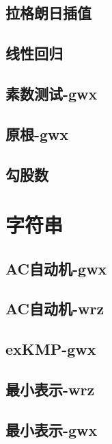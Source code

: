 \documentclass[titlepage,a4paper,10pt]{article}
\begin{document}
\begin{spacing}{0.8}
			\subsection{拉格朗日插值}
				
			\subsection{线性回归}
				
			\subsection{素数测试-gwx}
				
			\subsection{原根-gwx}
				
			\subsection{勾股数}
				
		\section{字符串}
			\subsection{AC自动机-gwx}
				
			\subsection{AC自动机-wrz}
				
			\subsection{exKMP-gwx}
				
			\subsection{最小表示-wrz}
				
			\subsection{最小表示-gwx}
				

\end{spacing}
\end{document}

